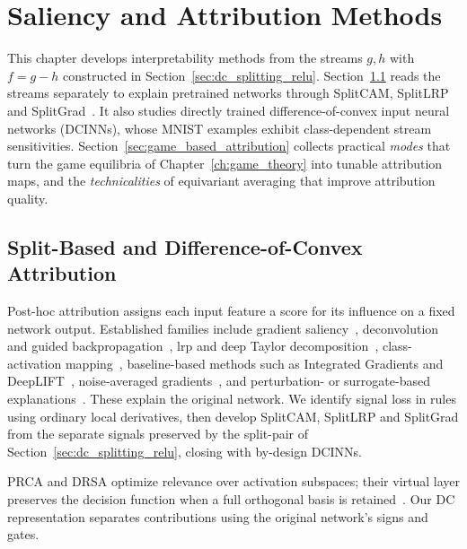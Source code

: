 \chapter{Saliency and Attribution Methods}\label{ch:saliency}

This chapter develops interpretability methods from the streams $g,h$ with $f=g-h$ constructed in Section~\ref{sec:dc_splitting_relu}. Section~\ref{sec:split_attribution_concept} reads the streams separately to explain pretrained networks through SplitCAM, SplitLRP and SplitGrad~\parencite{hiddenMono}. It also studies directly trained difference-of-convex input neural networks (DCINNs), whose MNIST examples exhibit class-dependent stream sensitivities. Section~\ref{sec:game_based_attribution} collects practical \emph{modes} that turn the game equilibria of Chapter~\ref{ch:game_theory} into tunable attribution maps, and the \emph{technicalities} of equivariant averaging that improve attribution quality.

\section{Split-Based and Difference-of-Convex Attribution}\label{sec:split_attribution_concept}

Post-hoc attribution assigns each input feature a score for its influence on a fixed network output. Established families include gradient saliency~\parencite{Simonyan2014}, deconvolution and guided backpropagation~\parencite{ZeilerFergus2014,Springenberg2015}, \ac{lrp} and deep Taylor decomposition~\parencite{Bach2015,Montavon2017DeepTaylor}, class-activation mapping~\parencite{Zhou2016,Selvaraju2017}, baseline-based methods such as Integrated Gradients and DeepLIFT~\parencite{Sundararajan2017,Shrikumar2017}, noise-averaged gradients~\parencite{Smilkov2017}, and perturbation- or surrogate-based explanations~\parencite{Ribeiro2016,FongVedaldi2017,LundbergLee2017,Kolek2023_ShearletX,Fel2023_EVA}. These explain the original network. We identify signal loss in rules using ordinary local derivatives, then develop SplitCAM, SplitLRP and SplitGrad from the separate signals preserved by the split-pair of Section~\ref{sec:dc_splitting_relu}, closing with by-design DCINNs.

PRCA and DRSA optimize relevance over activation subspaces; their virtual layer preserves the decision function when a full orthogonal basis is retained~\parencite{Chormai2024DRSA}. Our DC representation separates contributions using the original network's signs and gates.

